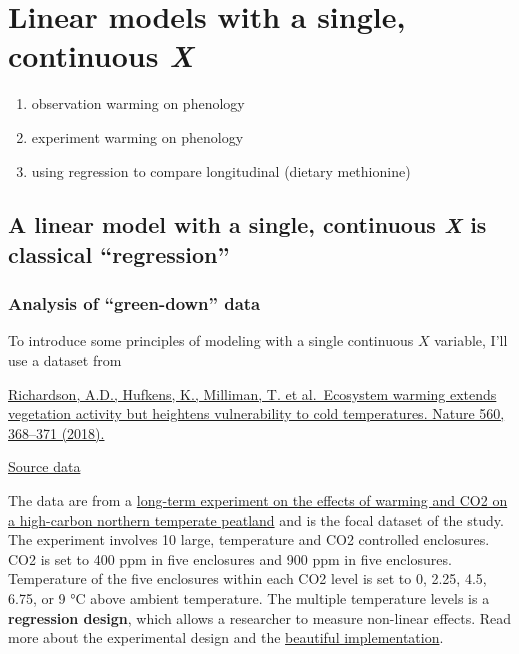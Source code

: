 \documentclass[]{book}
\providecommand{\tightlist}{%
  \setlength{\itemsep}{0pt}\setlength{\parskip}{0pt}}
\begin{document}
\hypertarget{linear-models-with-a-single-continuous-x}{%
\chapter{\texorpdfstring{Linear models with a single, continuous \emph{X}}{Linear models with a single, continuous X}}\label{linear-models-with-a-single-continuous-x}}

\begin{enumerate}
\def\labelenumi{\arabic{enumi}.}
\tightlist
\item
  observation warming on phenology
\item
  experiment warming on phenology
\item
  using regression to compare longitudinal (dietary methionine)
\end{enumerate}

\hypertarget{a-linear-model-with-a-single-continuous-x-is-classical-regression}{%
\section{\texorpdfstring{A linear model with a single, continuous \emph{X} is classical ``regression''}{A linear model with a single, continuous X is classical ``regression''}}\label{a-linear-model-with-a-single-continuous-x-is-classical-regression}}

\hypertarget{analysis-of-green-down-data}{%
\subsection{Analysis of ``green-down'' data}\label{analysis-of-green-down-data}}

To introduce some principles of modeling with a single continuous \(X\) variable, I'll use a dataset from

\href{https://doi.org/10.1038/s41586-018-0399-1}{Richardson, A.D., Hufkens, K., Milliman, T. et al.~Ecosystem warming extends vegetation activity but heightens vulnerability to cold temperatures. Nature 560, 368--371 (2018).}

\href{https://www.nature.com/articles/s41586-018-0399-1\#Sec15}{Source data}

The data are from a \href{https://mnspruce.ornl.gov}{long-term experiment on the effects of warming and CO2 on a high-carbon northern temperate peatland} and is the focal dataset of the study. The experiment involves 10 large, temperature and CO2 controlled enclosures. CO2 is set to 400 ppm in five enclosures and 900 ppm in five enclosures. Temperature of the five enclosures within each CO2 level is set to 0, 2.25, 4.5, 6.75, or 9 °C above ambient temperature. The multiple temperature levels is a \textbf{regression design}, which allows a researcher to measure non-linear effects. Read more about the experimental design and the \href{https://mnspruce.ornl.gov/design}{beautiful implementation}.
\end{document}

